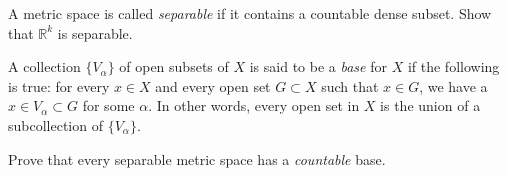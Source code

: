 \documentclass[12 pt, letterpaper]{hmcpset}
\begin{document}
\begin{problem}
	A metric space is called \emph{separable} if it contains a countable dense subset. Show that $\mathbb{R}^{k}$ is separable.
\end{problem}

\pagebreak

\begin{problem}
	A collection $\{ V_{\alpha} \}$ of open subsets of $X$ is said to be a \emph{base} for $X$ if the following is true: for every $x \in X$ and every open set $G \subset X$ such that $x \in G$, we have a $x \in V_{\alpha} \subset G$ for some $\alpha$. In other words, every open set in $X$ is the union of a subcollection of $\{ V_{\alpha} \}$.

	Prove that every separable metric space has a \emph{countable} base.
\end{problem}
\end{document}
